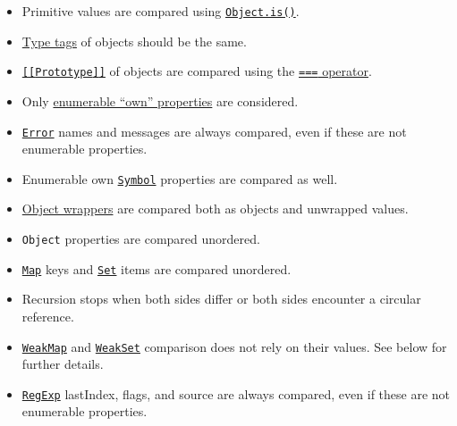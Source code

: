 \begin{itemize}
\tightlist
\item
  Primitive values are compared using
  \href{https://developer.mozilla.org/en-US/docs/Web/JavaScript/Reference/Global_Objects/Object/is}{\texttt{Object.is()}}.
\item
  \href{https://tc39.github.io/ecma262/\#sec-object.prototype.tostring}{Type
  tags} of objects should be the same.
\item
  \href{https://tc39.github.io/ecma262/\#sec-ordinary-object-internal-methods-and-internal-slots}{\texttt{{[}{[}Prototype{]}{]}}}
  of objects are compared using the
  \href{https://developer.mozilla.org/en-US/docs/Web/JavaScript/Reference/Operators/Strict_equality}{\texttt{===}
  operator}.
\item
  Only
  \href{https://developer.mozilla.org/en-US/docs/Web/JavaScript/Enumerability_and_ownership_of_properties}{enumerable
  ``own'' properties} are considered.
\item
  \href{errors.md\#class-error}{\texttt{Error}} names and messages are
  always compared, even if these are not enumerable properties.
\item
  Enumerable own
  \href{https://developer.mozilla.org/en-US/docs/Web/JavaScript/Reference/Global_Objects/Symbol}{\texttt{Symbol}}
  properties are compared as well.
\item
  \href{https://developer.mozilla.org/en-US/docs/Glossary/Primitive\#Primitive_wrapper_objects_in_JavaScript}{Object
  wrappers} are compared both as objects and unwrapped values.
\item
  \texttt{Object} properties are compared unordered.
\item
  \href{https://developer.mozilla.org/en-US/docs/Web/JavaScript/Reference/Global_Objects/Map}{\texttt{Map}}
  keys and
  \href{https://developer.mozilla.org/en-US/docs/Web/JavaScript/Reference/Global_Objects/Set}{\texttt{Set}}
  items are compared unordered.
\item
  Recursion stops when both sides differ or both sides encounter a
  circular reference.
\item
  \href{https://developer.mozilla.org/en-US/docs/Web/JavaScript/Reference/Global_Objects/WeakMap}{\texttt{WeakMap}}
  and
  \href{https://developer.mozilla.org/en-US/docs/Web/JavaScript/Reference/Global_Objects/WeakSet}{\texttt{WeakSet}}
  comparison does not rely on their values. See below for further
  details.
\item
  \href{https://developer.mozilla.org/en-US/docs/Web/JavaScript/Guide/Regular_Expressions}{\texttt{RegExp}}
  lastIndex, flags, and source are always compared, even if these are
  not enumerable properties.
\end{itemize}

